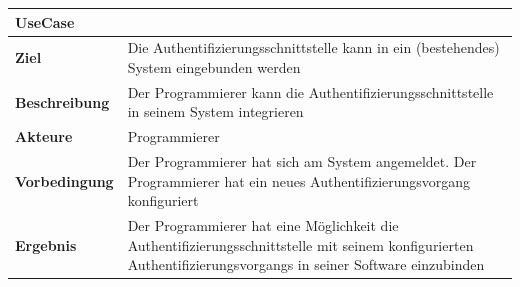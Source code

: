 \begin{longtable}[c]{@{}ll@{}}
\toprule
\begin{minipage}[b]{0.34\columnwidth}\raggedright\strut
\textbf{UseCase}
\strut\end{minipage} &
\begin{minipage}[b]{0.60\columnwidth}\raggedright\strut
\strut\end{minipage}\tabularnewline
\midrule
\endhead
\begin{minipage}[t]{0.34\columnwidth}\raggedright\strut
\textbf{Ziel}
\strut\end{minipage} &
\begin{minipage}[t]{0.60\columnwidth}\raggedright\strut
Die Authentifizierungsschnittstelle kann in ein (bestehendes) System
eingebunden werden
\strut\end{minipage}\tabularnewline
\begin{minipage}[t]{0.34\columnwidth}\raggedright\strut
\textbf{Beschreibung}
\strut\end{minipage} &
\begin{minipage}[t]{0.60\columnwidth}\raggedright\strut
Der Programmierer kann die Authentifizierungsschnittstelle in seinem
System integrieren
\strut\end{minipage}\tabularnewline
\begin{minipage}[t]{0.34\columnwidth}\raggedright\strut
\textbf{Akteure}
\strut\end{minipage} &
\begin{minipage}[t]{0.60\columnwidth}\raggedright\strut
Programmierer
\strut\end{minipage}\tabularnewline
\begin{minipage}[t]{0.34\columnwidth}\raggedright\strut
\textbf{Vorbedingung}
\strut\end{minipage} &
\begin{minipage}[t]{0.60\columnwidth}\raggedright\strut
Der Programmierer hat sich am System angemeldet. Der Programmierer hat
ein neues Authentifizierungsvorgang konfiguriert
\strut\end{minipage}\tabularnewline
\begin{minipage}[t]{0.34\columnwidth}\raggedright\strut
\textbf{Ergebnis}
\strut\end{minipage} &
\begin{minipage}[t]{0.60\columnwidth}\raggedright\strut
Der Programmierer hat eine Möglichkeit die
Authentifizierungsschnittstelle mit seinem konfigurierten
Authentifizierungsvorgangs in seiner Software einzubinden
\strut\end{minipage}\tabularnewline

\end{longtable}
